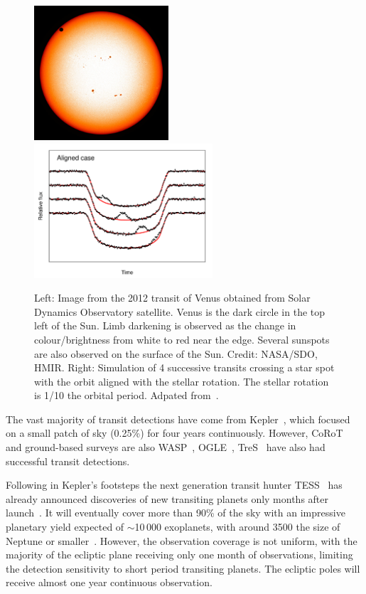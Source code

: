\begin{figure}
    \centering
    \includegraphics[height=5cm]{./figures/introduction/SDO_2012_Venus_Transit.jpg}
    \includegraphics[height=5cm]{figures/introduction/sanchisojedafig1-crop.pdf}
    \caption{Left: Image from the 2012 transit of Venus obtained from Solar Dynamics Observatory satellite. Venus is the dark circle in the top left of the Sun. Limb darkening is observed as the change in colour/brightness from white to red near the edge. Several sunspots are also observed on the surface of the Sun.
    Credit: NASA/SDO, HMIR. Right: Simulation of 4 successive transits crossing a star spot with the orbit aligned with the stellar rotation. The stellar rotation is 1/10 the orbital period. Adpated from~\citet[][Figure~1]{sanchis-ojeda_starspots_2013}.}
    \label{fig:transit_venus_transit_alignment}
\end{figure}


The vast majority of transit detections have come from Kepler~\citep{borucki_characteristics_2011}, which focused on a small patch of sky (0.25\%) for four years continuously.
However, {CoRoT}~\citet{barge_transiting_2008} and ground-based surveys are also WASP~\citep{pollacco_wasp_2006}, OGLE~\citep{udalski_optical_2002}, TreS~\citep{alonso_tres1_2004} have also had successful transit detections.

Following in Kepler's footsteps the next generation transit hunter {TESS}~\citep{ricker_transiting_2015} has already announced discoveries of new transiting planets only months after launch~\citep{vanderspek_tess_2018, gandolfi_tess_2018, huang_tess_2018}.
It will eventually cover more than 90\% of the sky with an impressive planetary yield expected of $\sim$10\,000 exoplanets, with around 3500 the size of Neptune or smaller~\citep{barclay_revised_2018, huang_expected_2018}.
However, the observation coverage is not uniform, with the majority of the ecliptic plane receiving only one month of observations, limiting the detection sensitivity to short period transiting planets. The ecliptic poles will receive almost one year continuous observation.


